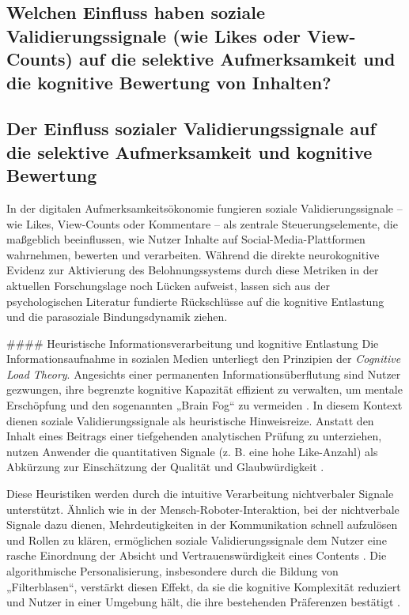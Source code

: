 \documentclass[11pt,a4paper]{article}
\begin{document}
\subsection{Welchen Einfluss haben soziale Validierungssignale (wie Likes oder View-Counts) auf die selektive Aufmerksamkeit und die kognitive Bewertung von Inhalten?}

\subsection{Der Einfluss sozialer Validierungssignale auf die selektive Aufmerksamkeit und kognitive Bewertung}

In der digitalen Aufmerksamkeitsökonomie fungieren soziale Validierungssignale – wie Likes, View-Counts oder Kommentare – als zentrale Steuerungselemente, die maßgeblich beeinflussen, wie Nutzer Inhalte auf Social-Media-Plattformen wahrnehmen, bewerten und verarbeiten. Während die direkte neurokognitive Evidenz zur Aktivierung des Belohnungssystems durch diese Metriken in der aktuellen Forschungslage noch Lücken aufweist, lassen sich aus der psychologischen Literatur fundierte Rückschlüsse auf die kognitive Entlastung und die parasoziale Bindungsdynamik ziehen.

\#\#\#\# Heuristische Informationsverarbeitung und kognitive Entlastung Die Informationsaufnahme in sozialen Medien unterliegt den Prinzipien der \textit{Cognitive Load Theory}. Angesichts einer permanenten Informationsüberflutung sind Nutzer gezwungen, ihre begrenzte kognitive Kapazität effizient zu verwalten, um mentale Erschöpfung und den sogenannten „Brain Fog“ zu vermeiden \autocite{grey_grey_d4bc9c0d0e8441ba90398520e73af07d}. In diesem Kontext dienen soziale Validierungssignale als heuristische Hinweisreize. Anstatt den Inhalt eines Beitrags einer tiefgehenden analytischen Prüfung zu unterziehen, nutzen Anwender die quantitativen Signale (z. B. eine hohe Like-Anzahl) als Abkürzung zur Einschätzung der Qualität und Glaubwürdigkeit \autocite{grey_grey_d4bc9c0d0e8441ba90398520e73af07d}.

Diese Heuristiken werden durch die intuitive Verarbeitung nichtverbaler Signale unterstützt. Ähnlich wie in der Mensch-Roboter-Interaktion, bei der nichtverbale Signale dazu dienen, Mehrdeutigkeiten in der Kommunikation schnell aufzulösen und Rollen zu klären, ermöglichen soziale Validierungssignale dem Nutzer eine rasche Einordnung der Absicht und Vertrauenswürdigkeit eines Contents \autocite{arxiv_2301_09025}. Die algorithmische Personalisierung, insbesondere durch die Bildung von „Filterblasen“, verstärkt diesen Effekt, da sie die kognitive Komplexität reduziert und Nutzer in einer Umgebung hält, die ihre bestehenden Präferenzen bestätigt \autocite{grey_grey_bbc8a51d8734471c850e8c2939fe8d32}.
\end{document}

